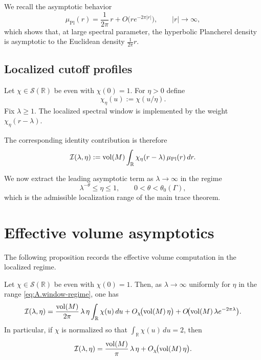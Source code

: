 We recall the asymptotic behavior
\begin{equation}
\label{eq:A.plancherel-asymptotic}
\mu_{\mathrm{Pl}}(r)
=
\frac{1}{2\pi}\,r
+
O\!\bigl(r e^{-2\pi |r|}\bigr),
\qquad |r|\to\infty,
\end{equation}
which shows that, at large spectral parameter, the hyperbolic Plancherel density is asymptotic to the Euclidean
density $\frac{1}{2\pi}r$.

\subsection{Localized cutoff profiles}
\label{subsec:A.localized-cutoff}

Let $\chi\in \mathcal{S}(\mathbb{R})$ be even with $\chi(0)=1$.  For $\eta>0$ define
\begin{equation}
\label{eq:A.chi-eta}
\chi_\eta(u)
:=
\chi(u/\eta).
\end{equation}
Fix $\lambda\ge 1$.  The localized spectral window is implemented by the weight $\chi_\eta(r-\lambda)$.

The corresponding identity contribution is therefore
\begin{equation}
\label{eq:A.identity-localized}
\mathcal{I}(\lambda,\eta)
:=
\mathop{\mathrm{vol}}\nolimits(M)\int_{\mathbb{R}} \chi_\eta(r-\lambda)\,\mu_{\mathrm{Pl}}(r)\,dr.
\end{equation}

We now extract the leading asymptotic term as $\lambda\to\infty$ in the regime
\begin{equation}
\label{eq:A.window-regime}
\lambda^{-\theta}\le \eta \le 1,
\qquad 0<\theta<\theta_0(\Gamma),
\end{equation}
which is the admissible localization range of the main trace theorem.

\section{Effective volume asymptotics}
\label{sec:A.effective-volume}

The following proposition records the effective volume computation in the localized regime.

\begin{proposition}
\label{prop:A.identity-asymptotic}
Let $\chi\in\mathcal{S}(\mathbb{R})$ be even with $\chi(0)=1$.  Then, as $\lambda\to\infty$ uniformly for
$\eta$ in the range \eqref{eq:A.window-regime}, one has
\begin{equation}
\label{eq:A.identity-asymptotic}
\mathcal{I}(\lambda,\eta)
=
\frac{\mathop{\mathrm{vol}}\nolimits(M)}{2\pi}\,\lambda\,\eta
\int_{\mathbb{R}}\chi(u)\,du
+
O_{\chi}\!\bigl(\mathop{\mathrm{vol}}\nolimits(M)\,\eta\bigr)
+
O\!\bigl(\mathop{\mathrm{vol}}\nolimits(M)\,\lambda e^{-2\pi\lambda}\bigr).
\end{equation}
In particular, if $\chi$ is normalized so that $\int_{\mathbb{R}}\chi(u)\,du=2$, then
\begin{equation}
\label{eq:A.identity-asymptotic-simplified}
\mathcal{I}(\lambda,\eta)
=
\frac{\mathop{\mathrm{vol}}\nolimits(M)}{\pi}\,\lambda\,\eta
+
O_{\chi}\!\bigl(\mathop{\mathrm{vol}}\nolimits(M)\,\eta\bigr).
\end{equation}
\end{proposition}

